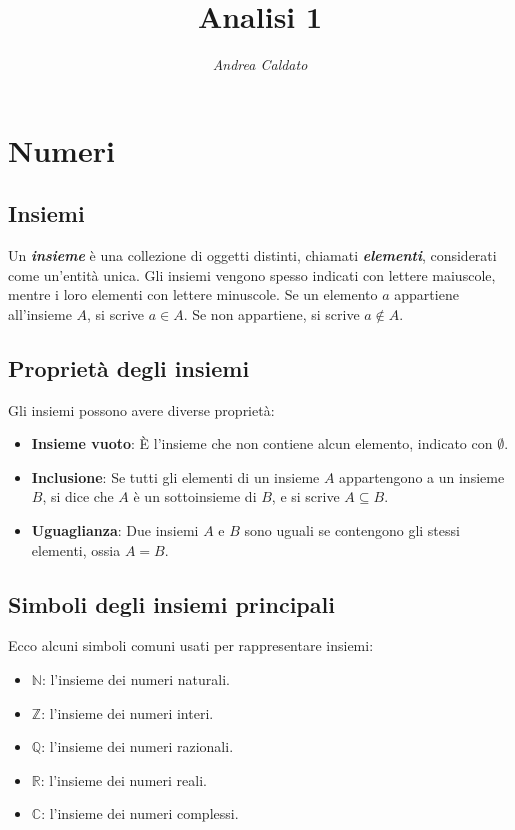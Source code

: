\documentclass[a4paper,12pt]{article}
\title{\textbf{Analisi 1}}
\author{\textit{Andrea Caldato}}
\date{}
\begin{document}
\maketitle

\tableofcontents

\newpage

\section{Numeri}
\subsection{Insiemi}

Un \textbf{\emph{insieme}} è una collezione di oggetti distinti, chiamati \textbf{\emph{elementi}}, considerati come un'entità unica. Gli insiemi vengono spesso indicati con lettere maiuscole, mentre i loro elementi con lettere minuscole. Se un elemento \( a \) appartiene all'insieme \( A \), si scrive \( a \in A \). Se non appartiene, si scrive \( a \notin A \).

\subsection{Proprietà degli insiemi}

Gli insiemi possono avere diverse proprietà:
\begin{itemize}
	\item \textbf{Insieme vuoto}: È l'insieme che non contiene alcun elemento, indicato con \( \emptyset \).
	\item \textbf{Inclusione}: Se tutti gli elementi di un insieme \( A \) appartengono a un insieme \( B \), si dice che \( A \) è un sottoinsieme di \( B \), e si scrive \( A \subseteq B \).
	\item \textbf{Uguaglianza}: Due insiemi \( A \) e \( B \) sono uguali se contengono gli stessi elementi, ossia \( A = B \).
\end{itemize}

\subsection{Simboli degli insiemi principali}

Ecco alcuni simboli comuni usati per rappresentare insiemi:
\begin{itemize}
	\item \( \mathbb{N} \): l'insieme dei numeri naturali.
	\item \( \mathbb{Z} \): l'insieme dei numeri interi.
	\item \( \mathbb{Q} \): l'insieme dei numeri razionali.
	\item \( \mathbb{R} \): l'insieme dei numeri reali.
	\item \( \mathbb{C} \): l'insieme dei numeri complessi.
\end{itemize}
\end{document}
